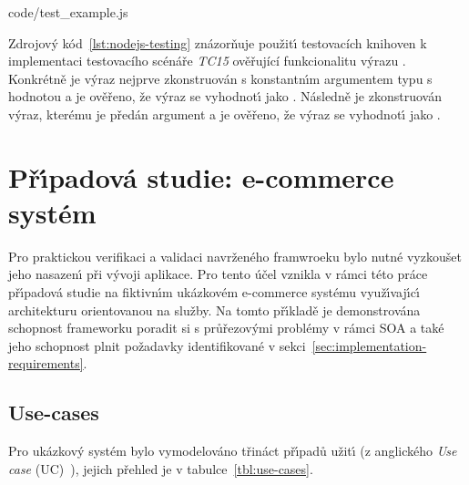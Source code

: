 
{code/test_example.js}

Zdrojov\'y kód~\ref{lst:nodejs-testing} znázorňuje použit\'{\i} testovacích knihoven k implementaci testovacího
scénáře \textit{TC15} ověřující funkcionalitu výrazu . Konkrétně je výraz nejprve zkonstruován s
konstantn\'{\i}m argumentem typu  s hodnotou  a je ověřeno, že v\'yraz se vyhodnot\'{\i}
jako . Následně je zkonstruován v\'yraz, kterému je předán argument  a je ověřeno,
že v\'yraz se vyhodnot\'{\i} jako .

\section{Př\'{\i}padová studie: e-commerce systém}

Pro praktickou verifikaci a validaci navrženého framwroeku bylo nutné vyzkoušet
jeho nasazen\'{\i} při v\'yvoji aplikace. Pro tento účel vznikla v
rámci této práce př\'{\i}padová studie na fiktivn\'{\i}m
ukázkovém e-commerce systému využ\'{\i}vaj\'{\i}c\'{\i} architekturu orientovanou na služby.
Na tomto př\'{\i}kladě je demonstrována schopnost frameworku poradit si s průřezov\'ymi
problémy v rámci \gls{SOA} a také jeho schopnost plnit požadavky identifikované v
sekci~\ref{sec:implementation-requirements}.

\subsection{Use-cases}

Pro ukázkov\'y systém bylo vymodelováno třináct př\'{\i}padů užit\'{\i}
(z anglického \textit{Use case} (\gls{UC})~\cite{bittner2002use}), jejich
přehled je v tabulce~\ref{tbl:use-cases}.

